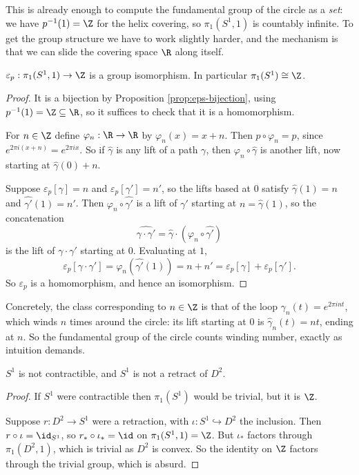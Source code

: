 This is already enough to compute the fundamental group of the circle as a \emph{set}: we
have $p^{-1}(1) = \Z$ for the helix covering, so $\pi_1(S^1, 1)$ is countably infinite. To
get the group structure we have to work slightly harder, and the mechanism is that we
can slide the covering space $\R$ along itself.

\begin{theorem} \label{thm:pi1-circle}
	$\varepsilon_p: \pi_1(S^1, 1) \to \Z$ is a group isomorphism. In particular $\pi_1(S^1) \cong \Z$.
\end{theorem}
\begin{proof}
	It is a bijection by Proposition \ref{prop:eps-bijection}, using $p^{-1}(1) = \Z \subseteq \R$, so it suffices to check that it is a homomorphism.

	For $n \in \Z$ define $\varphi_n: \R \to \R$ by $\varphi_n(x) = x + n$. Then $p \circ \varphi_n = p$, since $e^{2\pi i (x+n)} = e^{2\pi i x}$. So if $\hat\gamma$ is any lift of a path $\gamma$, then $\varphi_n \circ \hat\gamma$ is another lift, now starting at $\hat\gamma(0) + n$.

	Suppose $\varepsilon_p[\gamma] = n$ and $\varepsilon_p[\gamma'] = n'$, so the lifts based at $0$ satisfy $\hat\gamma(1) = n$ and $\hat{\gamma'}(1) = n'$. Then $\varphi_n \circ \hat{\gamma'}$ is a lift of $\gamma'$ starting at $n = \hat\gamma(1)$, so the concatenation
	$$
	\widehat{\gamma \cdot \gamma'} = \hat\gamma \cdot (\varphi_n \circ \hat{\gamma'})
	$$
	is the lift of $\gamma \cdot \gamma'$ starting at $0$. Evaluating at $1$,
	$$
	\varepsilon_p[\gamma\cdot\gamma'] = \varphi_n(\hat{\gamma'}(1)) = n + n' = \varepsilon_p[\gamma] + \varepsilon_p[\gamma'].
	$$
	So $\varepsilon_p$ is a homomorphism, and hence an isomorphism.
\end{proof}

Concretely, the class corresponding to $n \in \Z$ is that of the loop
$\gamma_n(t) = e^{2\pi i n t}$, which winds $n$ times around the circle: its lift starting
at $0$ is $\hat\gamma_n(t) = nt$, ending at $n$. So the fundamental group of the circle
counts winding number, exactly as intuition demands.

\begin{corollary}
	$S^1$ is not contractible, and $S^1$ is not a retract of $D^2$.
\end{corollary}
\begin{proof}
	If $S^1$ were contractible then $\pi_1(S^1)$ would be trivial, but it is $\Z$.

	Suppose $r: D^2 \to S^1$ were a retraction, with $\iota: S^1 \hookrightarrow D^2$ the inclusion. Then $r \circ \iota = \id_{S^1}$, so $r_* \circ \iota_* = \id$ on $\pi_1(S^1, 1) = \Z$. But $\iota_*$ factors through $\pi_1(D^2, 1)$, which is trivial as $D^2$ is convex. So the identity on $\Z$ factors through the trivial group, which is absurd.
\end{proof}

